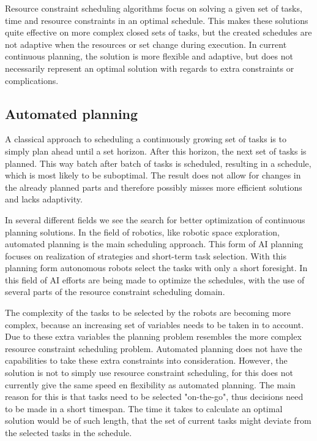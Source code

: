 \documentclass{article}
\begin{document}
Resource constraint scheduling algorithms focus on solving a given set of tasks, time and resource constraints in an optimal schedule.
This makes these solutions quite effective on more complex closed sets of tasks, but the created schedules are not adaptive when the resources or set change during execution.
In current continuous planning, the solution is more flexible and adaptive, but does not necessarily represent an optimal solution with regards to extra constraints or complications.
\cite{laborie03}

\subsection{Automated planning}

A classical approach to scheduling a continuously growing set of tasks is to simply plan ahead until a set horizon.
After this horizon, the next set of tasks is planned.
This way batch after batch of tasks is scheduled, resulting in a schedule, which is most likely to be suboptimal.
The result does not allow for changes in the already planned parts and therefore possibly misses more efficient solutions and lacks adaptivity.
\cite{chien00}

In several different fields we see the search for better optimization of continuous planning solutions.
In the field of robotics, like robotic space exploration, automated planning is the main scheduling approach.
This form of AI planning focuses on realization of strategies and short-term task selection.
With this planning form autonomous robots select the tasks with only a short foresight.
In this field of AI efforts are being made to optimize the schedules, with the use of several parts of the resource constraint scheduling domain.
\cite{smith00}

The complexity of the tasks to be selected by the robots are becoming more complex, because an increasing set of variables needs to be taken in to account.
Due to these extra variables the planning problem resembles the more complex resource constraint scheduling problem.
Automated planning does not have the capabilities to take these extra constraints into consideration.
However, the solution is not to simply use resource constraint scheduling, for this does not currently give the same speed en flexibility as automated planning.
The main reason for this is that tasks need to be selected "on-the-go", thus decisions need to be made in a short timespan.
The time it takes to calculate an optimal solution would be of such length, that the set of current tasks might deviate from the selected tasks in the schedule.
\end{document}
